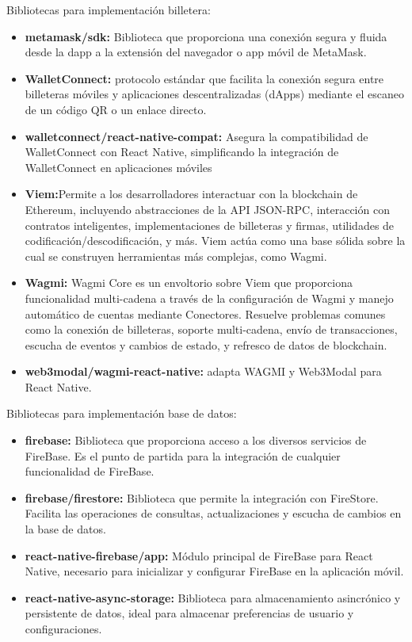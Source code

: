 Bibliotecas para implementación billetera:
\begin{itemize}

\item \textbf{metamask/sdk:} Biblioteca que proporciona una conexión segura y fluida desde la dapp a la extensión del navegador o app móvil de MetaMask. 

\item \textbf{WalletConnect:} protocolo estándar que facilita la conexión segura entre billeteras móviles y aplicaciones descentralizadas (dApps) mediante el escaneo de un código QR o un enlace directo.

\item \textbf{walletconnect/react-native-compat:} Asegura la compatibilidad de WalletConnect con React Native, simplificando la integración de WalletConnect en aplicaciones móviles

\item \textbf{Viem:}Permite a los desarrolladores interactuar con la blockchain de Ethereum, incluyendo abstracciones de la API JSON-RPC, interacción con contratos inteligentes, implementaciones de billeteras y firmas, utilidades de codificación/descodificación, y más. Viem actúa como una base sólida sobre la cual se construyen herramientas más complejas, como Wagmi.

\item \textbf{Wagmi:} Wagmi Core es un envoltorio sobre Viem que proporciona funcionalidad multi-cadena a través de la configuración de Wagmi y manejo automático de cuentas mediante Conectores. Resuelve problemas comunes como la conexión de billeteras, soporte multi-cadena, envío de transacciones, escucha de eventos y cambios de estado, y refresco de datos de blockchain.

\item \textbf{web3modal/wagmi-react-native:} adapta WAGMI y Web3Modal para React Native.

\end{itemize}


Bibliotecas para implementación base de datos:
\begin{itemize}

\item \textbf{firebase:} Biblioteca que proporciona acceso a los diversos servicios de FireBase. Es el punto de partida para la integración de cualquier funcionalidad de FireBase.

\item \textbf{firebase/firestore:} Biblioteca que permite la integración con FireStore. Facilita las operaciones de consultas, actualizaciones y escucha de cambios en la base de datos.

\item \textbf{react-native-firebase/app:} Módulo principal de FireBase para React Native, necesario para inicializar y configurar FireBase en la aplicación móvil.

\item \textbf{react-native-async-storage:} Biblioteca para almacenamiento asincrónico y persistente de datos, ideal para almacenar preferencias de usuario y configuraciones.

\end{itemize}


